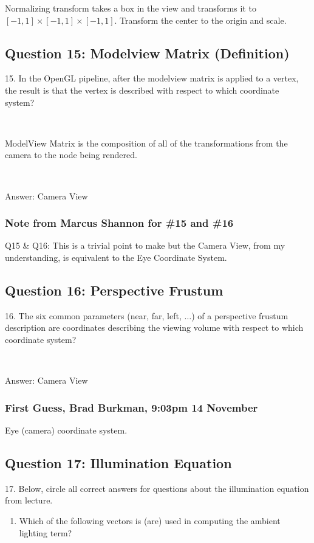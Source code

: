 \documentclass[11pt]{article}
\begin{document}
\begin{spacing}{1.2}
Normalizing transform takes a box in the view and transforms it to $[-1,1]\times [-1,1] \times [-1,1]$.  Transform the center to the origin and scale.  

\subsection{Question 15:  Modelview Matrix (Definition)}
15.  In the OpenGL pipeline, after the modelview matrix is applied to a vertex, the result is that the vertex is described with respect to which coordinate system?

\

ModelView Matrix is the composition of all of the transformations from the camera to the
node being rendered.

\ 

Answer:  Camera View
\subsubsection{Note from Marcus Shannon for \#15 and \#16}
Q15 \& Q16: This is a trivial point to make but the Camera View, from my understanding, is equivalent to the Eye Coordinate System.

\subsection{Question 16:  Perspective Frustum}
16.  The six common parameters (near, far, left, $\dots$) of a perspective frustum description are coordinates describing the viewing volume with respect to which coordinate system?

\

Answer:  Camera View

\subsubsection{First Guess, Brad Burkman, 9:03pm 14 November}

Eye (camera) coordinate system.

\subsection{Question 17:  Illumination Equation}
17.  Below, circle all correct answers for questions about the illumination equation from lecture.  

\begin{enumerate}[label=\arabic*)]
	\item Which of the following vectors is (are) used in computing the ambient lighting term?
	

\end{enumerate}
\end{spacing}
\end{document}
